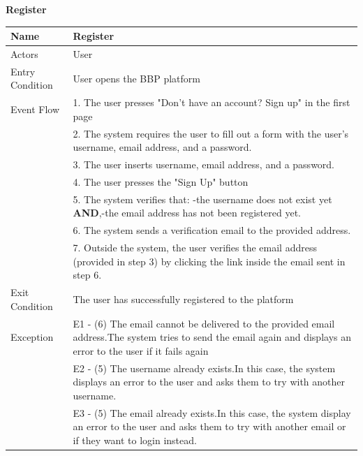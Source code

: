 \begin{enumerate}[label=\textbf{[UC\arabic*]}]

    \item \textbf{Register}
        \begin{center}
            \begin{tabular}{|p{4cm}|p{11cm}|}
                \hline
                \textbf{Name} & \textbf{Register} \\
                \hline
                Actors & User \\
                \hline
                Entry Condition & User opens the BBP platform \\
                \hline
                Event Flow & 
                1. The user presses "Don't have an account? Sign up" in the first page\\
                & 2. The system requires the user to fill out a form with the user's username, email address, and a password.\\
                & 3. The user inserts username, email address, and a password.\\
                & 4. The user presses the "Sign Up" button\\
                & 5. The system verifies that: \newline -the username does not exist yet \textbf{AND},\newline -the email address has not been registered yet. \\
                & 6. The system sends a verification email to the provided address.\\
                & 7. Outside the system, the user verifies the email address (provided in step 3) by clicking the link inside the email sent in step 6. \\
                \hline
                Exit Condition & The user has successfully registered to the platform \\
                \hline
                Exception & E1 - (6) The email cannot be delivered to the provided email address.\newline The system tries to send the email again and displays an error to the user if it fails again \\
                & E2 - (5) The username already exists.\newline In this case, the system displays an error to the user and asks them to try with another username. \\
                & E3 - (5) The email already exists.\newline In this case, the system display an error to the user and asks them to try with another email or if they want to login instead. \\

\end{tabular}
\end{center}
\end{enumerate}
